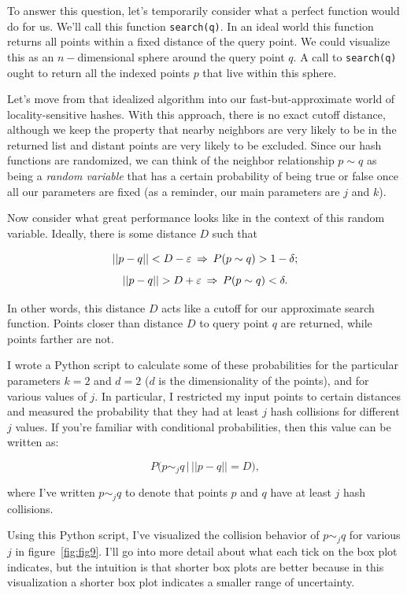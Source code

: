 \documentclass[20pt,]{extarticle}
\begin{document}
To answer this question, let's temporarily consider what a perfect
function would do for us. We'll call this function \texttt{search(q)}.
In an ideal world this function returns all points within a fixed
distance of the query point. We could visualize this as an
\(n-\)dimensional sphere around the query point \(q\). A call to
\texttt{search(q)} ought to return all the indexed points \(p\) that
live within this sphere.

Let's move from that idealized algorithm into our fast-but-approximate
world of locality-sensitive hashes. With this approach, there is no
exact cutoff distance, although we keep the property that nearby
neighbors are very likely to be in the returned list and distant points
are very likely to be excluded. Since our hash functions are randomized,
we can think of the neighbor relationship \(p\sim q\) as being a
\emph{random variable} that has a certain probability of being true or
false once all our parameters are fixed (as a reminder, our main
parameters are \(j\) and \(k\)).

Now consider what great performance looks like in the context of this
random variable. Ideally, there is some distance \(D\) such that

\[||p-q|| < D-\varepsilon \quad{\hskip -0.8em}\Rightarrow\quad{\hskip -0.8em} P(p\sim q) > 1 - \delta;\]
\[||p-q|| > D+\varepsilon \quad{\hskip -0.8em}\Rightarrow\quad{\hskip -0.8em} P(p\sim q) < \delta.\]

In other words, this distance \(D\) acts like a cutoff for our
approximate search function. Points closer than distance \(D\) to query
point \(q\) are returned, while points farther are not.

I wrote a Python script to calculate some of these probabilities for the
particular parameters \(k=2\) and \(d=2\) (\(d\) is the dimensionality
of the points), and for various values of \(j\). In particular, I
restricted my input points to certain distances and measured the
probability that they had at least \(j\) hash collisions for different
\(j\) values. If you're familiar with conditional probabilities, then
this value can be written as:

\[ P\big(p \sim_j q \, \big| \, ||p-q|| = D\big), \]

where I've written \(p\sim_j q\) to denote that points \(p\) and \(q\)
have at least \(j\) hash collisions.

Using this Python script, I've visualized the collision behavior of
\(p\sim_j q\) for various \(j\) in figure~\ref{fig:fig9}. I'll go into
more detail about what each tick on the box plot indicates, but the
intuition is that shorter box plots are better because in this
visualization a shorter box plot indicates a smaller range of
uncertainty.
\end{document}
